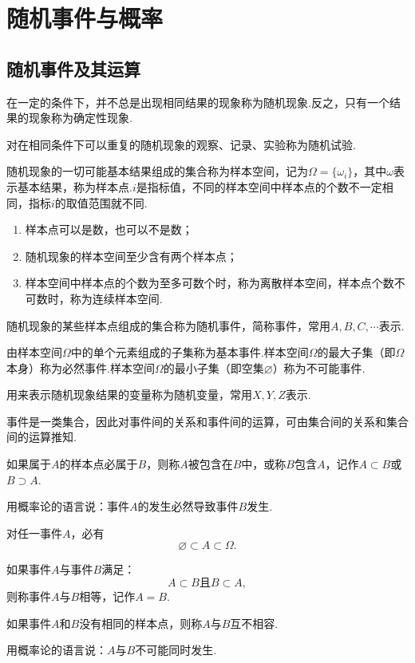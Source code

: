 \chapter{随机事件与概率}
\section{随机事件及其运算}
在一定的条件下，并不总是出现相同结果的现象称为{\heiti 随机现象}.反之，只有一个结果的现象称为确定性现象.

对在相同条件下可以重复的随机现象的观察、记录、实验称为{\heiti 随机试验}.
\begin{definition}[样本空间]
	随机现象的一切可能基本结果组成的集合称为{\heiti 样本空间}，记为$\varOmega=\{\omega_i\}$，其中$\omega$表示基本结果，称为{\heiti 样本点}.$i$是指标值，不同的样本空间中样本点的个数不一定相同，指标$i$的取值范围就不同.
\end{definition}
\begin{remark}
	\begin{enumerate}[(1)]
		\item 样本点可以是数，也可以不是数；
		\item 随机现象的样本空间至少含有两个样本点；
		\item 样本空间中样本点的个数为至多可数个时，称为{\heiti 离散样本空间}，样本点个数不可数时，称为{\heiti 连续样本空间}.
	\end{enumerate}
\end{remark}
随机现象的某些样本点组成的集合称为{\heiti 随机事件}，简称{\heiti 事件}，常用$A,B,C,\cdots$表示.

由样本空间$\varOmega$中的单个元素组成的子集称为{\heiti 基本事件}.样本空间$\varOmega$的最大子集（即$\varOmega$本身）称为{\heiti 必然事件}.样本空间$\varOmega$的最小子集（即空集$\varnothing$）称为{\heiti 不可能事件}.

用来表示随机现象结果的变量称为{\heiti 随机变量}，常用$X,Y,Z$表示.

事件是一类集合，因此对事件间的关系和事件间的运算，可由集合间的关系和集合间的运算推知.
\begin{definition}[包含关系]
	如果属于$A$的样本点必属于$B$，则称$A$被包含在$B$中，或称$B$包含$A$，记作$A\subset B$或$B\supset A$.
\end{definition}
\begin{remark}
	用概率论的语言说：事件$A$的发生必然导致事件$B$发生.
\end{remark}
\begin{remark}
	对任一事件$A$，必有
	$$\varnothing\subset A\subset\varOmega.$$
\end{remark}
\begin{definition}[相等关系]
	如果事件$A$与事件$B$满足：
	$$A\subset B\text{且}B\subset A,$$
	则称事件$A$与$B$相等，记作$A=B$.
\end{definition}
\begin{definition}[互不相容]
	如果事件$A$和$B$没有相同的样本点，则称$A$与$B$互不相容.
\end{definition}
\begin{remark}
	用概率论的语言说：$A$与$B$不可能同时发生.
\end{remark}

